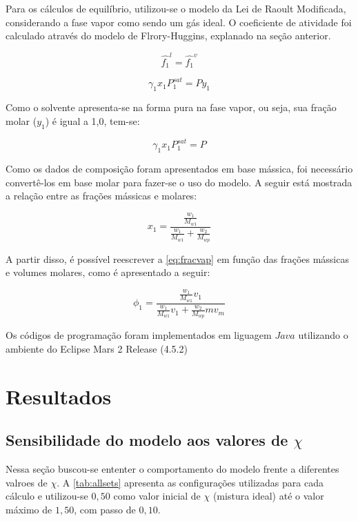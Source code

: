 Para os cálculos de equilíbrio, utilizou-se o modelo da Lei de Raoult
Modificada, considerando a fase vapor como sendo um gás ideal. O coeficiente de
atividade foi calculado através do modelo de Flrory-Huggins, explanado na seção
anterior.

\begin{equation}
\hat{f_1}^l = \hat{f_1}^v
\end{equation}

\begin{equation}
\gamma_1x_1P_1^{sat} = Py_1
\end{equation}

Como o solvente apresenta-se na forma pura na fase vapor, ou seja, sua fração
molar ($y_1$) é igual a 1,0, tem-se:

\begin{equation}
\gamma_1x_1P_1^{sat} = P
\end{equation}

Como os dados de composição foram apresentados em base mássica, foi necessário
convertê-los em base molar para fazer-se o uso do modelo. A seguir está mostrada
a relação entre as frações mássicas e molares:

\begin{equation}
x_1
=\frac{\displaystyle
\frac{w_1}{M_{w1}}}{\displaystyle\frac{w_1}{M_{w1}}+\frac{w_2}{M_{wp}}}
\end{equation}

A partir disso, é possível reescrever a \autoref{eq:fracvap} em função das
frações mássicas e volumes molares, como é apresentado a seguir:

\begin{equation}
\phi_1 =
\frac{\displaystyle\frac{w_1}{M_{w1}}v_1}{\displaystyle\frac{w_1}{M_{w1}}v_1+\displaystyle\frac{w_2}{M_{wp}}mv_m}
\end{equation}

Os códigos de programação foram implementados em
liguagem $Java$ utilizando o ambiente do Eclipse Mars 2 Release (4.5.2)


\section{Resultados}

\subsection{Sensibilidade do modelo aos valores de $\chi$ }
Nessa seção buscou-se ententer o comportamento do modelo frente a diferentes
valroes de $\chi$. A \autoref{tab:allsets} apresenta as configurações utilizadas
para cada cálculo e utilizou-se $0,50$ como valor inicial de $\chi$ (mistura
ideal) até o valor máximo de $1,50$, com passo de $0,10$.

